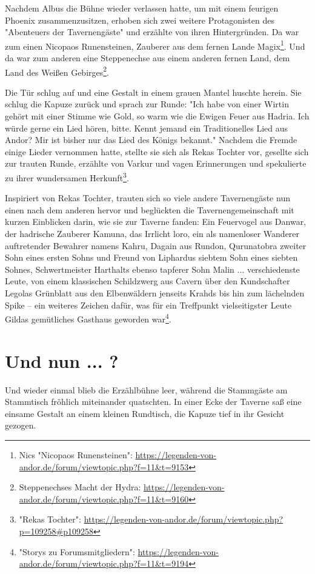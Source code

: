 Nachdem Albus die Bühne wieder verlassen hatte, um mit einem feurigen Phoenix zusammenzusitzen, erhoben sich zwei weitere Protagonisten des "Abenteuers der Tavernengäste" und erzählte von ihren Hintergründen. Da war zum einen Nicopaos Runensteinen, Zauberer aus dem fernen Lande Magix\footnote{Nics "Nicopaos Runensteinen": \url{https://legenden-von-andor.de/forum/viewtopic.php?f=11&t=9153}}. Und da war zum anderen eine Steppenechse aus einem anderen fernen Land, dem Land des Weißen Gebirges\footnote{Steppenechses Macht der Hydra: \url{https://legenden-von-andor.de/forum/viewtopic.php?f=11&t=9160}}.

Die Tür schlug auf und eine Gestalt in einem grauen Mantel huschte herein. Sie schlug die Kapuze zurück und sprach zur Runde: "Ich habe von einer Wirtin gehört mit einer Stimme wie Gold, so warm wie die Ewigen Feuer aus Hadria. Ich würde gerne ein Lied hören, bitte. Kennt jemand ein Traditionelles Lied aus Andor? Mir ist bisher nur das Lied des Königs bekannt." Nachdem die Fremde einige Lieder vernommen hatte, stellte sie sich als Rekas Tochter vor, gesellte sich zur trauten Runde, erzählte von Varkur und vagen Erinnerungen und spekulierte zu ihrer wundersamen Herkunft\footnote{"Rekas Tochter": \url{https://legenden-von-andor.de/forum/viewtopic.php?p=109258\#p109258}}. 

Inspiriert von Rekas Tochter, trauten sich so viele andere Tavernengäste nun einen nach dem anderen hervor und beglückten die Tavernengemeinschaft mit kurzen Einblicken darin, wie sie zur Taverne fanden: Ein Feuervogel aus Danwar, der hadrische Zauberer Kamuna, das Irrlicht loro, ein als namenloser Wanderer auftretender Bewahrer namens Kahru, Dagain aus Rundon, Qurunatobra zweiter Sohn eines ersten Sohns und Freund von Liphardus siebtem Sohn eines siebten Sohnes, Schwertmeister Harthalts ebenso tapferer Sohn Malin ... verschiedenste Leute, von einem klassischen Schildzwerg aus Cavern über den Kundschafter Legolas Grünblatt aus den Elbenwäldern jenseits Krahds bis hin zum lächelnden Spike -- ein weiteres Zeichen dafür, was für ein Treffpunkt vielseitigster Leute Gildas gemütliches Gasthaus geworden war\footnote{"Storys zu Forumsmitgliedern": \url{https://legenden-von-andor.de/forum/viewtopic.php?f=11&t=9194}}.


\section{Und nun ... ?}

Und wieder einmal blieb die Erzählbühne leer, während die Stammgäste am Stammtisch fröhlich miteinander quatschten. In einer Ecke der Taverne saß eine einsame Gestalt an einem kleinen Rundtisch, die Kapuze tief in ihr Gesicht gezogen.

